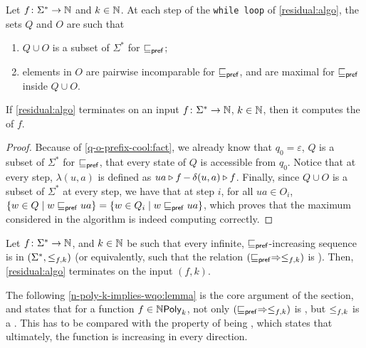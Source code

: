 \begin{fact}
    \label{q-o-prefix-cool:fact}
    Let $f \colon \Sigma^* \to \Nat$ and $k \in \Nat$.
    At each step of the \texttt{while loop}
    of \cref{residual:algo}, the sets
    $Q$ and $O$ are such that
    \begin{enumerate}
        \item $Q \cup O$ is a  subset of 
            $\Sigma^*$ for $\prefleq$;
        \item elements in $O$ are pairwise incomparable
            for $\prefleq$, and are maximal
            for $\prefleq$ inside $Q \cup O$.
    \end{enumerate}
\end{fact}

\begin{lemma}
    \label{correct-residual:lemma}
    If \cref{residual:algo} terminates on 
    an input $f \colon \Sigma^* \to \Nat$, $k \in \Nat$,
    then it computes the  of $f$.
\end{lemma}
\begin{proof}
    Because of \cref{q-o-prefix-cool:fact},
    we already know that $q_0 = \varepsilon$,
    $Q$ is a  subset of $\Sigma^*$
    for $\prefleq$, 
    that every state of $Q$ is accessible from $q_0$.
    Notice that at every step,
    $\lambda(u,a)$ is defined as
    $\app{f}{ua} - \app{f}{\delta(u,a)}$.
    Finally, since $Q \cup O$ is a  subset of $\Sigma^*$
    at every step,
    we have that at step $i$,
    for all $ua \in O_i$,
    $\setof{w \in Q}{w \prefleq ua} = \setof{w \in Q_i}{ w \prefleq ua}$,
    which proves that the maximum considered in the algorithm
    is indeed computing correctly.
\end{proof}



\begin{lemma}
    \label{wqo-implies-termination:lemma}
    Let $f \colon \Sigma^* \to \Nat$, and $k \in \Nat$ be such that
    every infinite, $\prefleq$-increasing sequence is 
    in $(\Sigma^*, \resleq{f}{k})$
    (or equivalently, such that the relation $(\prefleq \Rightarrow \resleq{f}{k})$
    is ).
    Then, \cref{residual:algo} terminates on the input $(f,k)$.
\end{lemma}

The following \cref{n-poly-k-implies-wqo:lemma} is the core argument of the
section, and states that for a function $f \in \NPoly[k]$, not only $(\prefleq
\Rightarrow \resleq{f}{k})$ is , but $\resleq{f}{k}$ is a
. This has to be compared with the property of being
, which states that ultimately, the function is
increasing in every direction.

